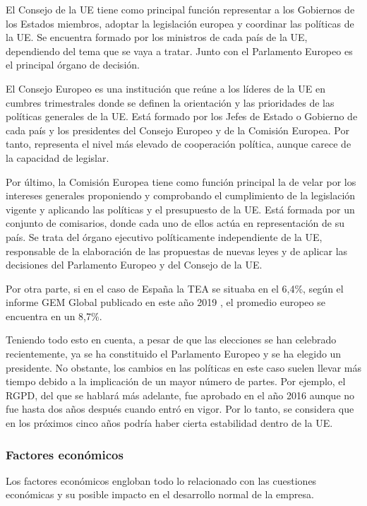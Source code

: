 El Consejo de la \acs{UE} tiene como principal función representar a los Gobiernos de los Estados miembros, adoptar la legislación europea y coordinar las políticas de la \acs{UE}. Se encuentra formado por los ministros de cada país de la \acs{UE}, dependiendo del tema que se vaya a tratar. Junto con el Parlamento Europeo es el principal órgano de decisión.

El Consejo Europeo es una institución que reúne a los líderes de la \acs{UE} en cumbres trimestrales donde se definen la orientación y las prioridades de las políticas generales de la \acs{UE}. Está formado por los Jefes de Estado o Gobierno de cada país y los presidentes del Consejo Europeo y de la Comisión Europea. Por tanto, representa el nivel más elevado de cooperación política, aunque carece de la capacidad de legislar.

Por último, la Comisión Europea tiene como función principal la de velar por los intereses generales proponiendo y comprobando el cumplimiento de la legislación vigente y aplicando las políticas y el presupuesto de la \acs{UE}. Está formada por un conjunto de comisarios, donde cada uno de ellos actúa en representación de su país. Se trata del órgano ejecutivo políticamente independiente de la \acs{UE}, responsable de la elaboración de las propuestas de nuevas leyes y de aplicar las decisiones del Parlamento Europeo y del Consejo de la \acs{UE}.

Por otra parte, si en el caso de España la \acs{TEA} se situaba en el 6,4\%, según el informe \acs{GEM} Global publicado en este año 2019 \cite{informegemglobal}, el promedio europeo se encuentra en un 8,7\%.

Teniendo todo esto en cuenta, a pesar de que las elecciones se han celebrado recientemente, ya se ha constituido el Parlamento Europeo y se ha elegido un presidente. No obstante, los cambios en las políticas en este caso suelen llevar más tiempo debido a la implicación de un mayor número de partes. Por ejemplo, el \acf{RGPD}, del que se hablará más adelante, fue aprobado en el año 2016 aunque no fue hasta dos años después cuando entró en vigor. Por lo tanto, se considera que en los próximos cinco años podría haber cierta estabilidad dentro de la \acs{UE}.

\clearpage

\subsubsection{Factores económicos}
Los factores económicos engloban todo lo relacionado con las cuestiones económicas y su posible impacto en el desarrollo normal de la empresa.

